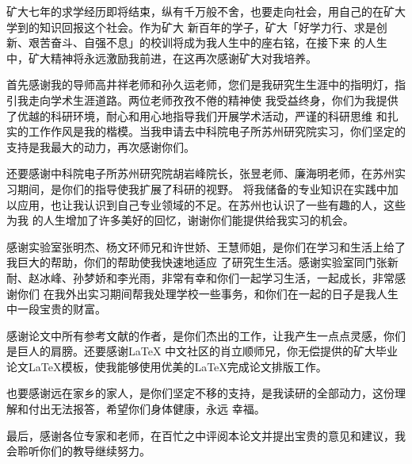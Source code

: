 \documentclass[preprint,MD,numbers,times]{cumtthesis}
\begin{document}
\begin{acknowledgements}
矿大七年的求学经历即将结束，纵有千万般不舍，也要走向社会，用自己的在矿大学到的知识回报这个社会。作为矿大
新百年的学子，矿大「好学力行、求是创新、艰苦奋斗、自强不息」的校训将成为我人生中的座右铭，在接下来
的人生中，矿大精神将永远激励我前进，在这再次感谢矿大对我培养。

首先感谢我的导师高井祥老师和孙久运老师，您们是我研究生生涯中的指明灯，指引我走向学术生涯道路。两位老师孜孜不倦的精神使
我受益终身，你们为我提供了优越的科研环境，耐心和用心地指导我们开展学术活动，严谨的科研思维
和扎实的工作作风是我的楷模。当我申请去中科院电子所苏州研究院实习，你们坚定的支持是我最大的动力，再次感谢你们。

还要感谢中科院电子所苏州研究院胡岩峰院长，张昱老师、廉海明老师，在苏州实习期间，是你们的指导使我扩展了科研的视野。
将我储备的专业知识在实践中加以应用，也让我认识到自己专业领域的不足。在苏州也认识了一些有趣的人，这些为我
的人生增加了许多美好的回忆，谢谢你们能提供给我实习的机会。

感谢实验室张明杰、杨文环师兄和许世娇、王慧师姐，是你们在学习和生活上给了我巨大的帮助，你们的帮助使我快速地适应
了研究生生活。感谢实验室同门张新耐、赵冰峰、孙梦娇和李光雨，非常有幸和你们一起学习生活，一起成长，非常感谢你们
在我外出实习期间帮我处理学校一些事务，和你们在一起的日子是我人生中一段宝贵的财富。

感谢论文中所有参考文献的作者，是你们杰出的工作，让我产生一点点灵感，你们是巨人的肩膀。还要感谢\LaTeX
中文社区的肖立顺师兄，你无偿提供的矿大毕业论文\LaTeX{}模板，使我能够使用优美的\LaTeX{}完成论文排版工作。

也要感谢远在家乡的家人，是你们坚定不移的支持，是我读研的全部动力，这份理解和付出无法报答，希望你们身体健康，永远
幸福。

最后，感谢各位专家和老师，在百忙之中评阅本论文并提出宝贵的意见和建议，我会聆听你们的教导继续努力。
\end{acknowledgements}
\end{document}
